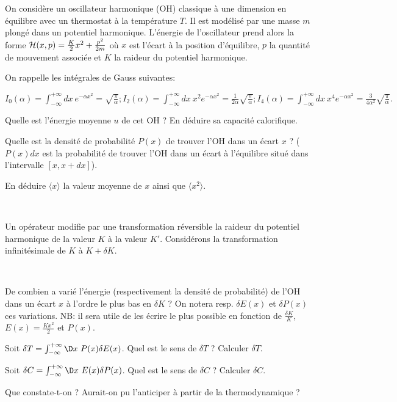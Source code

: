 On considère un oscillateur harmonique (OH) classique à une dimension en équilibre avec un thermostat à la température $T$. Il est modélisé par une masse $m$ plongé dans un potentiel harmonique. L'énergie de l'oscillateur prend alors la forme ${\cal H}(x,p)=\frac{K}{2}x^2+\frac{p^2}{2m}$ où $x$ est l'écart à la position d'équilibre, $p$ la quantité de mouvement associée et $K$ la raideur du potentiel harmonique.

On rappelle les intégrales de Gauss suivantes:

\begin{center}
$I_0(\alpha)=\int_{-\infty}^{+\infty} dx \ e^{-\alpha x^2}=\sqrt{\frac{\pi}{\alpha}}; I_2(\alpha)=\int_{-\infty}^{+\infty} dx \ x^2 e^{-\alpha x^2}=\frac{1}{2\alpha}\sqrt{\frac{\pi}{\alpha}};I_4(\alpha)=\int_{-\infty}^{+\infty} dx \ x^4 e^{-\alpha x^2}=\frac{3}{4\alpha^2}\sqrt{\frac{\pi}{\alpha}}.$    
\end{center}

\question Quelle est l'énergie moyenne $u$ de cet OH ? En déduire sa capacité calorifique.

\question Quelle est la densité de probabilité $P(x)$ de trouver l'OH dans un écart  $x$ ? ($P(x)dx$ est la probabilité de trouver l'OH dans un écart à l'équilibre situé dans l'intervalle $[x,x+dx]$).

\question En déduire $\langle x \rangle$ la valeur moyenne de $x$ ainsi que $\langle x^2 \rangle$. 

\

Un opérateur modifie par une transformation réversible la raideur du potentiel harmonique de la valeur $K$ à la valeur $K'$. Considérons la transformation infinitésimale de $K$ à $K+\delta K$.

\

\question De combien  a varié l'énergie (respectivement la densité de probabilité) de l'OH dans un écart $x$ à l'ordre le plus bas en $\delta K$ ? On notera resp. $\delta E(x)$ et $\delta P(x)$ ces variations. NB: il sera utile de les écrire le plus possible en fonction de $\frac{\delta K}{K}$, $E(x)=\frac{Kx^2}{2}$ et $P(x)$.

\question Soit $\delta T=\int_{-\infty}^{+\infty} \D x \ P(x) \delta E(x)$. Quel est le sens de $\delta T$ ? Calculer $\delta T$.

\question Soit $\delta C=\int_{-\infty}^{+\infty} \D x \ E(x) \delta P(x)$. Quel est le sens de $\delta C$ ? Calculer $\delta C$.

\question Que constate-t-on ? Aurait-on pu l'anticiper à partir de la thermodynamique ?

